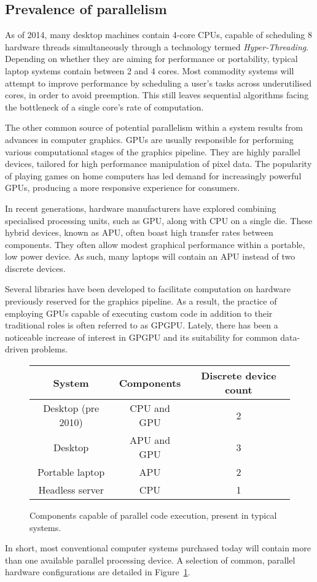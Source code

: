\subsection{Prevalence of parallelism}
As of 2014, many desktop machines contain 4-core \acp{CPU}, capable of scheduling 8 hardware threads simultaneously through a technology termed \emph{Hyper-Threading}\cite{marr2002hyper}.
Depending on whether they are aiming for performance or portability, typical laptop systems contain between 2 and 4 cores.
Most commodity systems will attempt to improve performance by scheduling a user's tasks across underutilised cores, in order to avoid preemption. This still leaves sequential algorithms facing the bottleneck of a single core's rate of computation.

The other common source of potential parallelism within a system results from advances in computer graphics.
\acp{GPU} are usually responsible for performing various computational stages of the graphics pipeline. They are highly parallel devices, tailored for high performance manipulation of pixel data. The popularity of playing games on home computers has led demand for increasingly powerful \acp{GPU}, producing a more responsive experience for consumers.

In recent generations, hardware manufacturers have explored combining specialised processing units, such as \ac{GPU}, along with \ac{CPU} on a single die. These hybrid devices, known as \ac{APU}, often boast high transfer rates between components. They often allow modest graphical performance within a portable, low power device. As such, many laptops will contain an \ac{APU} instead of two discrete devices.

Several libraries have been developed to facilitate computation on hardware previously reserved for the graphics pipeline. As a result, the practice of employing \acp{GPU} capable of executing custom code in addition to their traditional roles is often referred to as \ac{GPGPU}.
Lately, there has been a noticeable increase of interest in \ac{GPGPU} and its suitability for common data-driven problems.

\begin{figure}
\begin{center}
  \begin{tabular}{ | c | c | c |}
    \hline
    System & Components & Discrete device count \\ \hline
    Desktop (pre 2010) & \ac{CPU} and \ac{GPU} & 2 \\ \hline
    Desktop & \ac{APU} and \ac {GPU} & 3 \\ \hline
    Portable laptop & \ac{APU} & 2 \\ \hline
    Headless server & \ac{CPU} & 1 \\ \hline
    \end{tabular}
  \caption{Components capable of parallel code execution, present in typical systems.}
  \label{fig:par_table}
\end{center}
\end{figure}

In short, most conventional computer systems purchased today will contain more than one available parallel processing device. A selection of common, parallel hardware configurations are detailed in Figure~\ref{fig:par_table}.
